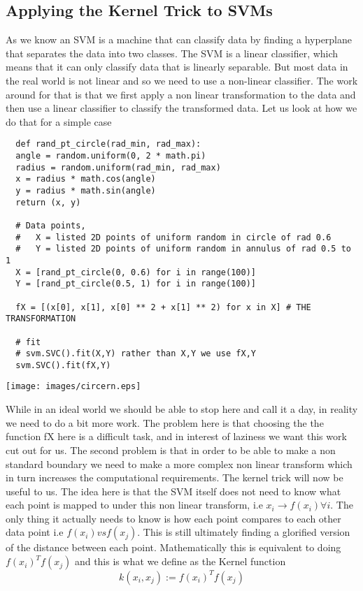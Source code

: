 \documentclass[hidelinks]{book}
\numberwithin{equation}{section}
\begin{document}
\subsection{Applying the Kernel Trick to SVMs}
  As we know an SVM is a machine that can classify data by finding a
  hyperplane that separates the data into two classes. The SVM is a linear
  classifier, which means that it can only classify data that is linearly
  separable. But most data in the real world is not linear and so we need to
  use a non-linear classifier. The work around for that is that we first apply
  a non linear transformation to the data and then use a linear classifier to
  classify the transformed data.
  Let us look at how we do that for a simple case
  \begin{verbatim}
  def rand_pt_circle(rad_min, rad_max):
  angle = random.uniform(0, 2 * math.pi)
  radius = random.uniform(rad_min, rad_max)
  x = radius * math.cos(angle)
  y = radius * math.sin(angle)
  return (x, y)

  # Data points,
  #   X = listed 2D points of uniform random in circle of rad 0.6
  #   Y = listed 2D points of uniform random in annulus of rad 0.5 to 1
  X = [rand_pt_circle(0, 0.6) for i in range(100)]
  Y = [rand_pt_circle(0.5, 1) for i in range(100)]

  fX = [(x[0], x[1], x[0] ** 2 + x[1] ** 2) for x in X] # THE TRANSFORMATION

  # fit
  # svm.SVC().fit(X,Y) rather than X,Y we use fX,Y
  svm.SVC().fit(fX,Y)
  \end{verbatim}

  \begin{center}
    \texttt{[image: images/circern.eps]}
  \end{center}

  While in an ideal world we should be able to stop here and call it a day, in
  reality we need to do a bit more work. The problem here is that choosing the
  the function fX here is a difficult task, and in interest of laziness we
  want this work cut out for us. The second problem is that in order to be
  able to make a non standard boundary we need to make a more complex non
  linear transform which in turn increases the computational requirements. The
  kernel trick will now be useful to us. The idea here is that the SVM itself
  does not need to know what each point is mapped to under this non linear
  transform, i.e $x_i \rightarrow f(x_i) \forall i$. The only thing it
  actually needs to know is how each point compares to each other data point
  i.e $f(x_i) vs f(x_j)$. This is still ultimately finding a glorified version
  of the distance between each point. Mathematically this is equivalent to
  doing $f(x_i)^T f(x_j)$ and this is what we define as the Kernel function
  $$k(x_i, x_j) := f(x_i)^T f(x_j) $$
\end{document}
